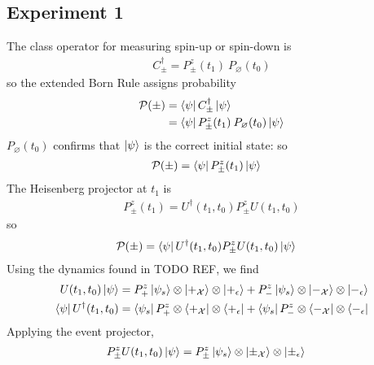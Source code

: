 \subsection{Experiment 1}
The class operator for measuring spin-up or spin-down is
\begin{align}
  C_\pm^\dagger = P^z_\pm (t_1) \: P_\varnothing (t_0)
\end{align}
so the extended Born Rule assigns probability
\begin{align}
  \mathcal{P}(\pm) &= \bra{\psi} C_\pm^\dagger \ket{\psi} \\ \nonumber
  &= \bra{\psi} P^z_\pm (t_1) \: P_\varnothing (t_0) \ket{\psi}
\end{align}
$P_\varnothing (t_0)$ confirms that $\ket{\psi}$ is the correct initial state:
so
\begin{align}
  \mathcal{P}(\pm) &= \bra{\psi} P^z_\pm (t_1) \ket{\psi}
\end{align}
The Heisenberg projector at $t_1$ is
\begin{align}
  P^z_\pm (t_1) = U^\dagger(t_1, t_0) P^z_\pm U(t_1, t_0)
\end{align}
so
\begin{align}
  \mathcal{P}(\pm) &= \bra{\psi} U^\dagger(t_1, t_0) P^z_\pm U(t_1, t_0) \ket{\psi}
\end{align}
Using the dynamics found in TODO REF, we find
\begin{align}
  U(t_1, t_0) \ket{\psi} &= P^z_+ \ket{\psi_s} \otimes \ket{+_\mathcal{X}} \otimes \ket{+_\epsilon} + P^z_- \ket{\psi_s} \otimes \ket{-_\mathcal{X}} \otimes \ket{-_\epsilon} \\ \nonumber
  \bra{\psi} U^\dagger(t_1, t_0) &= \bra{\psi_s}P^z_+ \otimes \bra{+_\mathcal{X}} \otimes \bra{+_\epsilon} + \bra{\psi_s}P^z_- \otimes \bra{-_\mathcal{X}} \otimes \bra{-_\epsilon}
\end{align}
Applying the event projector,
\begin{align}
  P^z_\pm U(t_1, t_0) \ket{\psi} &= P^z_\pm \ket{\psi_s} \otimes \ket{\pm_\mathcal{X}} \otimes \ket{\pm_\epsilon}
\end{align}
